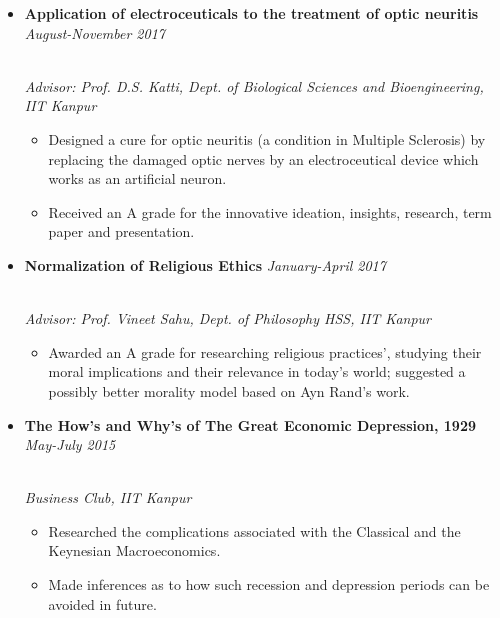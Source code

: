 \documentclass{article}
\begin{document}
\vspace{-3mm}

\begin{itemize}

\item \textbf{Application of electroceuticals to the treatment of optic neuritis}
     \hfill\textit{August-November 2017}
     
     \vspace{-1mm}
     
     \\[3pt] \textit{\small Advisor: Prof. D.S. Katti, Dept. of Biological Sciences and Bioengineering, IIT Kanpur  }  
    \begin{itemize}
        \item Designed a cure for optic neuritis (a condition in Multiple Sclerosis) by replacing the damaged optic nerves by an electroceutical device which works as an artificial neuron. 
        \item Received an A grade for the innovative ideation, insights, research, term paper and presentation. 
    \end{itemize}
    
  
    
    \item \textbf{Normalization of Religious Ethics}
     \hfill\textit{January-April 2017}
     \vspace{-1mm}
     
     \\[3pt]  \textit{\small Advisor: Prof. Vineet Sahu, Dept. of Philosophy HSS,
     IIT Kanpur  }
    \begin{itemize}
        \item Awarded an A grade for researching religious practices', studying their moral implications and their relevance in today's world; suggested a possibly better morality model based on Ayn Rand's work. 
    \end{itemize}
    
    \item \textbf{The How’s and Why’s of The Great Economic Depression, 1929}   \hfill\textit{May-July 2015} \\
    
    \vspace{-1mm}
    
    \\[3pt] \textit{\small Business Club, IIT Kanpur }
    \begin{itemize}
        \item Researched the complications associated with the Classical and the Keynesian Macroeconomics.
        \item Made inferences as to how such recession and depression periods can be avoided in future. 
    \end{itemize}
    
\vspace{-3mm}


\end{itemize}
\end{document}
